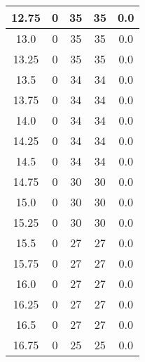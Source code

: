 \documentclass[letterpaper, 12pt]{article}
\begin{document}
\begin{longtable}{|c|c|c|c|c|}
\hline
12.75 & 0 & 35 & 35 & 0.0 \\
\hline
13.0 & 0 & 35 & 35 & 0.0 \\
\hline
13.25 & 0 & 35 & 35 & 0.0 \\
\hline
13.5 & 0 & 34 & 34 & 0.0 \\
\hline
13.75 & 0 & 34 & 34 & 0.0 \\
\hline
14.0 & 0 & 34 & 34 & 0.0 \\
\hline
14.25 & 0 & 34 & 34 & 0.0 \\
\hline
14.5 & 0 & 34 & 34 & 0.0 \\
\hline
14.75 & 0 & 30 & 30 & 0.0 \\
\hline
15.0 & 0 & 30 & 30 & 0.0 \\
\hline
15.25 & 0 & 30 & 30 & 0.0 \\
\hline
15.5 & 0 & 27 & 27 & 0.0 \\
\hline
15.75 & 0 & 27 & 27 & 0.0 \\
\hline
16.0 & 0 & 27 & 27 & 0.0 \\
\hline
16.25 & 0 & 27 & 27 & 0.0 \\
\hline
16.5 & 0 & 27 & 27 & 0.0 \\
\hline
16.75 & 0 & 25 & 25 & 0.0 \\
\hline
\end{longtable}
\end{document}
